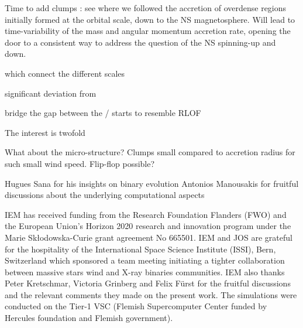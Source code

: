 \documentclass{aa}
\makeatletter
\newcommand*{\ns}{NS\@\xspace}
\makeatother
\begin{document}
Time to add clumps : see \cite{ElMellah} where we followed the accretion of overdense regions initially formed at the orbital scale, down to the \ns magnetosphere. Will lead to time-variability of the mass and angular momentum accretion rate, opening the door to a consistent way to address the question of the \ns spinning-up and down.

which connect the different scales 

significant deviation from 

bridge the gap between the  / starts to resemble RLOF

The interest is twofold \citep{Martinez-Nunez2017}

What about the micro-structure? Clumps small compared to accretion radius for such small wind speed. Flip-flop possible?

\begin{acknowledgements}
Hugues Sana for his insights on binary evolution
Antonios Manousakis for fruitful discussions about the underlying computational aspects

IEM has received funding from the Research Foundation Flanders (FWO) and the European Union's Horizon 2020 research and innovation program under the Marie Sk\l odowska-Curie grant agreement No 665501. IEM and JOS are grateful for the hospitality of the International Space Science Institute (ISSI), Bern, Switzerland which sponsored a team meeting initiating a tighter collaboration between massive stars wind and X-ray binaries communities. IEM also thanks Peter Kretschmar, Victoria Grinberg and Felix F\"urst for the fruitful discussions and the relevant comments they made on the present work. The simulations were conducted on the Tier-1 VSC (Flemish Supercomputer Center funded by Hercules foundation and Flemish government).

\end{acknowledgements}




\begin{tiny}

\end{tiny}
\end{document}
